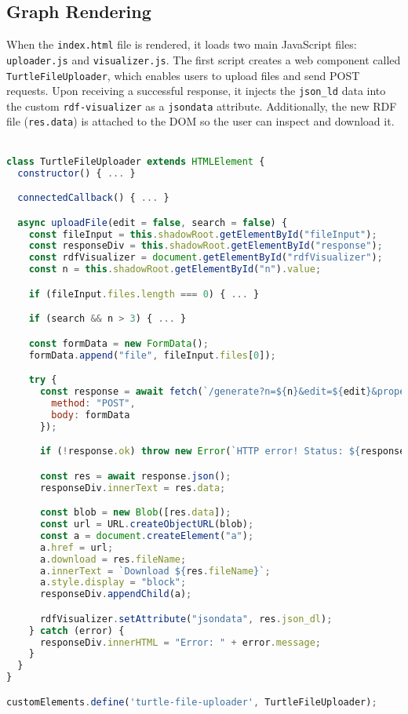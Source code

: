 \subsection{Graph Rendering}
When the \texttt{index.html} file is rendered, it loads two main JavaScript files: \texttt{uploader.js} and \texttt{visualizer.js}.  
The first script creates a web component called \texttt{TurtleFileUploader}, which enables users to upload files and send POST requests.  
Upon receiving a successful response, it injects the \texttt{json\_ld} data into the custom \texttt{rdf-visualizer} as a \texttt{jsondata} attribute.  
Additionally, the new RDF file (\texttt{res.data}) is attached to the DOM so the user can inspect and download it.
\\
\\
\begin{lstlisting}[caption={\texttt{TurtleFileUploader} component}, label={lst:turtle-file-uploader}, language=JavaScript]
class TurtleFileUploader extends HTMLElement {
  constructor() { ... }

  connectedCallback() { ... }

  async uploadFile(edit = false, search = false) {
    const fileInput = this.shadowRoot.getElementById("fileInput");
    const responseDiv = this.shadowRoot.getElementById("response");
    const rdfVisualizer = document.getElementById("rdfVisualizer");
    const n = this.shadowRoot.getElementById("n").value;

    if (fileInput.files.length === 0) { ... }

    if (search && n > 3) { ... }

    const formData = new FormData();
    formData.append("file", fileInput.files[0]);

    try {
      const response = await fetch(`/generate?n=${n}&edit=${edit}&property_search=${search}`, {
        method: "POST",
        body: formData
      });

      if (!response.ok) throw new Error(`HTTP error! Status: ${response.status}`);

      const res = await response.json();
      responseDiv.innerText = res.data;

      const blob = new Blob([res.data]);
      const url = URL.createObjectURL(blob);
      const a = document.createElement("a");
      a.href = url;
      a.download = res.fileName;
      a.innerText = `Download ${res.fileName}`;
      a.style.display = "block";
      responseDiv.appendChild(a);

      rdfVisualizer.setAttribute("jsondata", res.json_dl);
    } catch (error) {
      responseDiv.innerHTML = "Error: " + error.message;
    }
  }
}

customElements.define('turtle-file-uploader', TurtleFileUploader);
\end{lstlisting}

